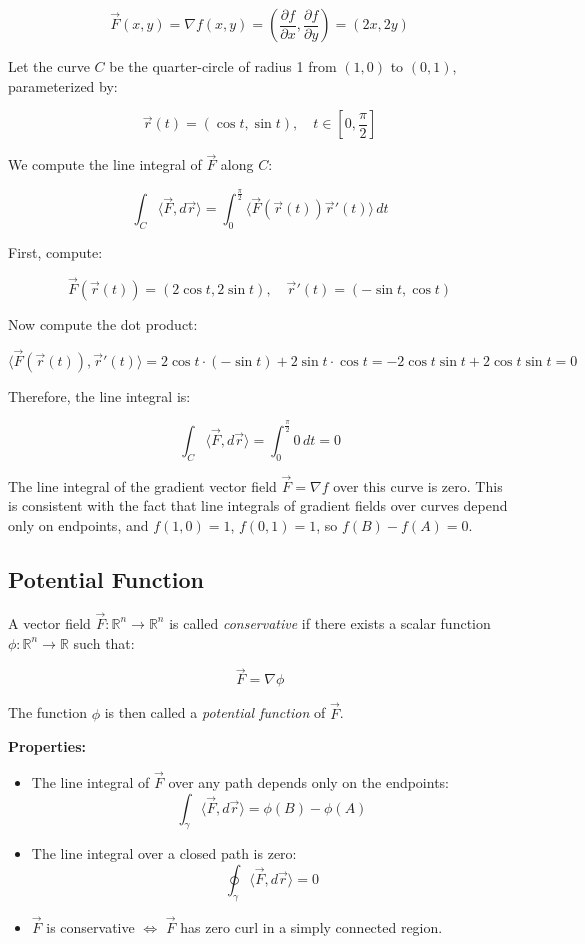 \[
\vec{F}(x, y) = \nabla f(x, y) = \left( \frac{\partial f}{\partial x}, \frac{\partial f}{\partial y} \right) = (2x, 2y)
\]

Let the curve \( C \) be the quarter-circle of radius 1 from \( (1, 0) \) to \( (0, 1) \), parameterized by:

\[
\vec{r}(t) = (\cos t, \sin t), \quad t \in \left[0, \frac{\pi}{2}\right]
\]

We compute the line integral of \( \vec{F} \) along \( C \):

\[
\int_C \langle \vec{F}, d\vec{r}\rangle = \int_0^{\frac{\pi}{2}} \langle\vec{F}(\vec{r}(t)) \vec{r}'(t) \rangle\, dt
\]

First, compute:

\[
\vec{F}(\vec{r}(t)) = (2\cos t, 2\sin t), \quad \vec{r}'(t) = (-\sin t, \cos t)
\]

Now compute the dot product:

\[
\langle\vec{F}(\vec{r}(t)), \vec{r}'(t)\rangle = 2\cos t \cdot (-\sin t) + 2\sin t \cdot \cos t = -2\cos t \sin t + 2\cos t \sin t = 0
\]

Therefore, the line integral is:

\[
\int_C \langle \vec{F}, d\vec{r}\rangle = \int_0^{\frac{\pi}{2}} 0 \, dt = 0
\]

The line integral of the gradient vector field \( \vec{F} = \nabla f \) over this curve is zero. 
This is consistent with the fact that line integrals of gradient fields over 
curves depend only on endpoints, and 
\( f(1,0) = 1 \), \( f(0,1) = 1 \), so \( f(B) - f(A) = 0 \).


\subsection{Potential Function}

A vector field \( \vec{F} : \mathbb{R}^n \to \mathbb{R}^n \) is called \emph{conservative} if there exists a scalar function \( \phi : \mathbb{R}^n \to \mathbb{R} \) such that:

\[
\vec{F} = \nabla \phi
\]

The function \( \phi \) is then called a \emph{potential function} of \( \vec{F} \).

\textbf{Properties:}
\begin{itemize}[label=\(-\)]
    \item The line integral of \( \vec{F} \) over any path depends only on the endpoints:
    \[
    \int_\gamma \langle \vec{F}, d\vec{r} \rangle = \phi(B) - \phi(A)
    \]
    \item The line integral over a closed path is zero:
    \[
    \oint_\gamma \langle \vec{F}, d\vec{r} \rangle = 0
    \]
    \item \( \vec{F} \) is conservative \( \Leftrightarrow \) \( \vec{F} \) has zero curl in a simply connected region.
\end{itemize}

